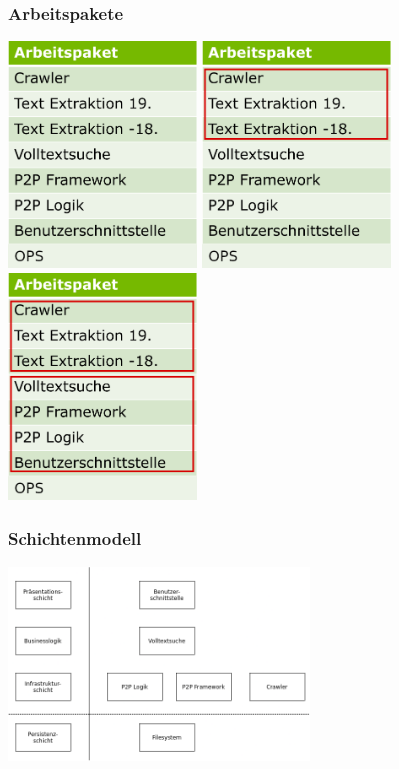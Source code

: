 \documentclass{beamer}
\begin{document}
\begin{frame}[allowframebreaks]
  \frametitle{Arbeitspakete}

  \includegraphics[width=5cm]{Arbeitspakete}
  \break
  \includegraphics[width=5cm]{Arbeitspakete-Crawler}
  \break
  \includegraphics[width=5cm]{Arbeitspakete-Main}
\end{frame}

\begin{frame}
  \frametitle{Schichtenmodell}

  \includegraphics[width=8cm]{Schichten}
\end{frame}
\end{document}
